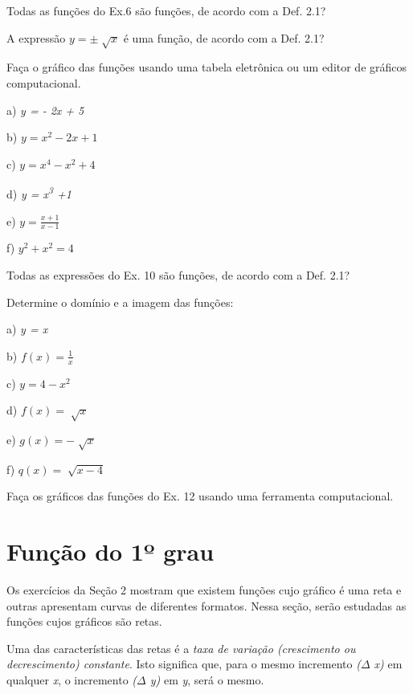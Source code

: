 \begin{exercicios}
\exitem{} Todas as funções do Ex.6 são funções, de acordo com a Def. 2.1?

\exitem{} A expressão  \( y= \pm \sqrt[]{x} \)    é uma função, de acordo com a Def. 2.1?

\exitem{} Faça o gráfico das funções usando uma tabela eletrônica ou um editor de gráficos computacional.

\begin{multicols}{3}
a) \textit{y = - 2x + 5}

b)  \( y=x^{2}-2x+1 \)

c) \textit{  \( y=x^{4}-x^{2}+4 \)}

d) \textit{y = x\textsuperscript{3} +1}

e) \( y=\frac{x+1}{x-1} \) \tab 

f) \( y^{2}+ x^{2}=4 \) 
\end{multicols}

\exitem{} Todas as expressões do Ex. 10 são funções, de acordo com a Def. 2.1?

\exitem{} Determine o domínio e a imagem das funções:

\begin{multicols}{3}
a) \textit{y = x}

b) \( f \left( x \right) =\frac{1}{x} \)

c) \( y=4-x^{2} \)

d)  \( f \left( x \right) =\sqrt[]{x} \)

e)  \( g \left( x \right) =-\sqrt[]{x} \)

f)  \( q \left( x \right) =\sqrt[]{x-4} \)
\end{multicols}

\item Faça os gráficos das funções do Ex. 12 usando uma ferramenta computacional.
\end{exercicios}

\section{Função do 1º grau}

Os exercícios da Seção 2 mostram que existem funções cujo gráfico é uma reta e outras apresentam curvas de diferentes formatos. Nessa seção, serão estudadas as funções cujos gráficos são retas.

Uma das características das retas é a \textit{taxa de variação (crescimento ou decrescimento) constante}. Isto significa que, para o mesmo incremento \textit{($ \Delta $ x) }em qualquer \textit{x}, o incremento \textit{($ \Delta $ y) }em \textit{y}, será o mesmo. 

